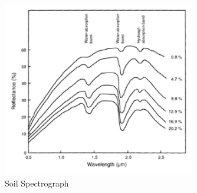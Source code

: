 \begin{figure}[H]
    \caption{Soil Spectrograph}
    \centering
    \includegraphics[width=0.75\textwidth]{images/GenericSoilSpectra.png}
\end{figure}

